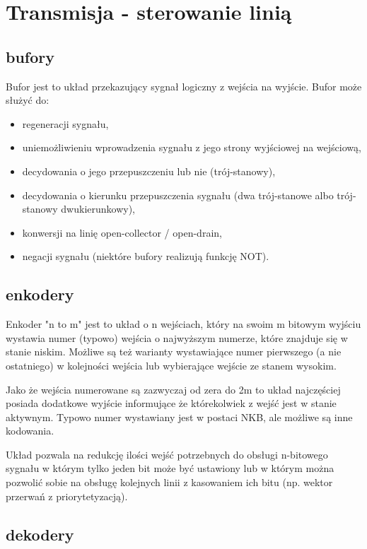 \section{Transmisja - sterowanie linią}
\subsection{bufory}

Bufor jest to układ przekazujący sygnał logiczny z wejścia na wyjście. Bufor może służyć do:
\begin{itemize}
\item regeneracji sygnału,
\item uniemożliwieniu wprowadzenia sygnału z jego strony wyjściowej na wejściową,
\item decydowania o jego przepuszczeniu lub nie (trój-stanowy),
\item decydowania o kierunku przepuszczenia sygnału (dwa trój-stanowe albo trój-stanowy dwukierunkowy),
\item konwersji na linię open-collector / open-drain,
\item negacji sygnału (niektóre bufory realizują funkcję NOT).
\end{itemize}

\subsection{enkodery}

Enkoder "n to m" jest to układ o n wejściach, który na swoim m bitowym wyjściu wystawia numer (typowo) wejścia o najwyższym numerze, które znajduje się w stanie niskim. Możliwe są też warianty wystawiające numer pierwszego (a nie ostatniego) w kolejności wejścia lub wybierające wejście ze stanem wysokim.

Jako że wejścia numerowane są zazwyczaj od zera do 2m to układ najczęściej posiada dodatkowe wyjście informujące że którekolwiek z wejść jest w stanie aktywnym. Typowo numer wystawiany jest w postaci NKB, ale możliwe są inne kodowania.

Układ pozwala na redukcję ilości wejść potrzebnych do obsługi n-bitowego sygnału w którym tylko jeden bit może być ustawiony lub w którym można pozwolić sobie na obsługę kolejnych linii z kasowaniem ich bitu (np. wektor przerwań z priorytetyzacją).

\subsection{dekodery}

